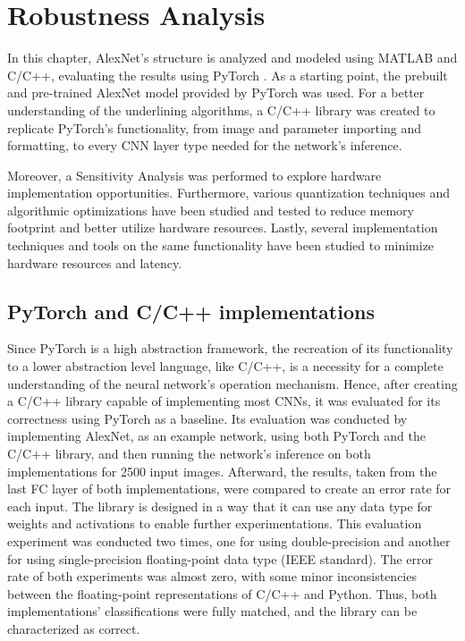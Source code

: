 \chapter{Robustness Analysis}

\label{Chapter-Robustness-Analysis}

In this chapter, AlexNet's \cite{ImageNet-classification-with-deep-convolutional-neural-networks} structure is analyzed and modeled using MATLAB \cite{MATLAB-Official-site} and C/C++, evaluating the results using PyTorch \cite{PyTorch-Official-site}. As a starting point, the prebuilt and pre-trained AlexNet model provided by PyTorch was used. For a better understanding of the underlining algorithms, a C/C++ library was created to replicate PyTorch's functionality, from image and parameter importing and formatting, to every CNN layer type needed for the network's inference.

Moreover, a Sensitivity Analysis was performed to explore hardware implementation opportunities. Furthermore, various quantization techniques and algorithmic optimizations have been studied and tested to reduce memory footprint and better utilize hardware resources. Lastly, several implementation techniques and tools on the same functionality have been studied to minimize hardware resources and latency.

\section{PyTorch and C/C++ implementations}
Since PyTorch is a high abstraction framework, the recreation of its functionality to a lower abstraction level language, like C/C++, is a necessity for a complete understanding of the neural network's operation mechanism. Hence, after creating a C/C++ library capable of implementing most CNNs, it was evaluated for its correctness using PyTorch as a baseline. Its evaluation was conducted by implementing AlexNet, as an example network, using both PyTorch and the C/C++ library, and then running the network's inference on both implementations for 2500 input images. Afterward, the results, taken from the last FC layer of both implementations, were compared to create an error rate for each input. The library is designed in a way that it can use any data type for weights and activations to enable further experimentations. This evaluation experiment was conducted two times, one for using double-precision and another for using single-precision floating-point data type (IEEE standard). The error rate of both experiments was almost zero, with some minor inconsistencies between the floating-point representations of C/C++ and Python. Thus, both implementations' classifications were fully matched, and the library can be characterized as correct.

